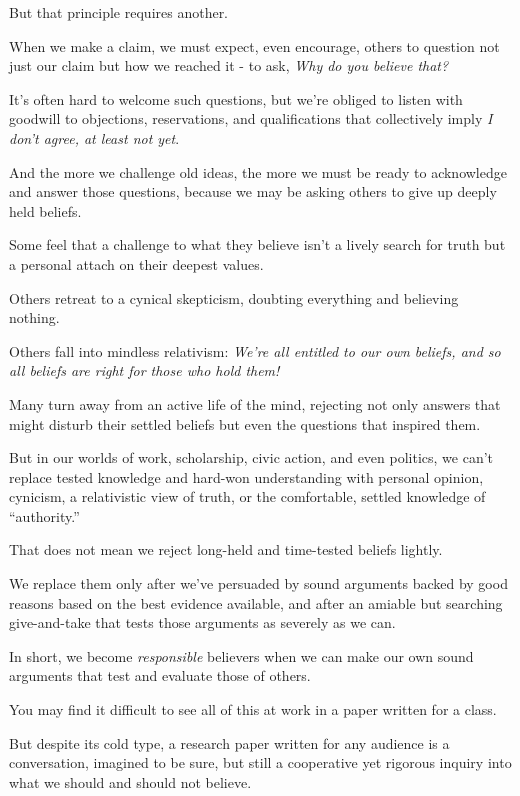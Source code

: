 \documentclass[oneside]{book}
\numberwithin{equation}{section}
\begin{document}
%
But that principle requires another.

When we make a claim, we must expect, even encourage, others to question not just our claim but how we reached it - to ask, \textit{Why do you believe that?}

It's often hard to welcome such questions, but we're obliged to listen with goodwill to objections, reservations, and qualifications that collectively imply \textit{I don't agree, at least not yet}.

And the more we challenge old ideas, the more we must be ready to acknowledge and answer those questions, because we may be asking others to give up deeply held beliefs.

%

Some feel that a challenge to what they believe isn't a lively search for truth but a personal attach on their deepest values.

Others retreat to a cynical skepticism, doubting everything and believing nothing.

Others fall into mindless relativism: \textit{We're all entitled to our own beliefs, and so all beliefs are right for those who hold them!}

Many turn away from an active life of the mind, rejecting not only answers that might disturb their settled beliefs but even the questions that inspired them.

%
But in our worlds of work, scholarship, civic action, and even politics, we can't replace tested knowledge and hard-won understanding with personal opinion, cynicism, a relativistic view of truth, or the comfortable, settled knowledge of ``authority.''

%
That does not mean we reject long-held and time-tested beliefs lightly.

We replace them only after we've persuaded by sound arguments backed by good reasons based on the best evidence available, and after an amiable but searching give-and-take that tests those arguments as severely as we can.

In short, we become \textit{responsible} believers when we can make our own sound arguments that test and evaluate those of others.

%
You may find it difficult to see all of this at work in a paper written for a class.

But despite its cold type, a research paper written for any audience is a conversation, imagined to be sure, but still a cooperative yet rigorous inquiry into what we should and should not believe.
\end{document}

